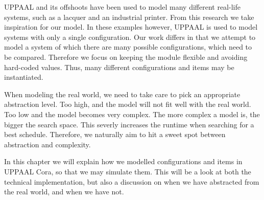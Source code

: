 UPPAAL and its offshoots have been used to model many different real-life systems, such as a lacquer\cite{so54514} and an industrial printer\cite{Igna2008}. From this research we take inspiration for our model. In these examples however, UPPAAL is used to model systems with only a single configuration. Our work differs in that we attempt to model a system of which there are many possible configurations, which need to be compared. Therefore we focus on keeping the module flexible and avoiding hard-coded values. Thus, many different configurations and items may be instantiated.

When modeling the real world, we need to take care to pick an appropriate abstraction level. Too high, and the model will not fit well with the real world. Too low and the model becomes very complex. The more complex a model is, the bigger the search space. This severly increases the runtime when searching for a best schedule. Therefore, we naturally aim to hit a sweet spot between abstraction and complexity.

In this chapter we will explain how we modelled configurations and items in UPPAAL Cora, so that we may simulate them. This will be a look at both the technical implementation, but also a discussion on when we have abstracted from the real world, and when we have not.  







